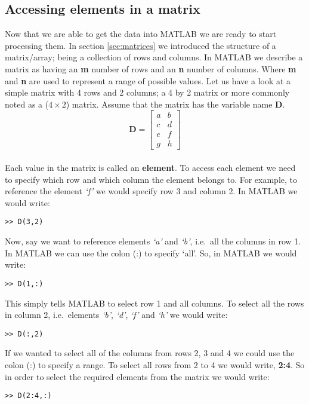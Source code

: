 \documentclass[12pt,a4paper]{article}
\begin{document}
\subsection{Accessing elements in a matrix}
Now that we are able to get the data into MATLAB we are ready to start processing them.  
In section \ref{sec:matrices} we introduced the structure of a matrix/array; being a collection of rows and columns.  
In MATLAB we describe a matrix as having an \textbf{m} number of rows and an \textbf{n} number of columns.  
Where \textbf{m} and \textbf{n} are used to represent a range of possible values.  
Let us have a look at a simple matrix with 4 rows and 2 columns; a 
4 by 2 matrix or more commonly noted as a ($4\times2$) matrix.  
Assume that the matrix has the variable name \textbf{D}.\\
\[ \textbf{D} = \left[ \begin{array}{cc}
a & b\\
c & d\\
e & f\\
g & h \end{array} \right]\]\\

Each value in the matrix is called an \textbf{element}.  
To access each element we need to specify which row and which column the element belongs to.  
For example, to reference the element \emph{`f'} we would specify row 3 and column 2.  
In MATLAB we would write:
\begin{lstlisting}[style=Matlab-editor]
>> D(3,2)
\end{lstlisting}	
Now, say we want to reference elements \emph{`a'} and \emph{`b'}, i.e.~all the columns in row 1.  
In MATLAB we can use the colon (:) to specify `all'.  
So, in MATLAB we would write:
\begin{lstlisting}[style=Matlab-editor]
>> D(1,:)
\end{lstlisting}

This simply tells MATLAB to select row 1 and all columns.  
To select all the rows in column 2, i.e.~elements \emph{`b'}, \emph{`d'}, \emph{`f'} and \emph{`h'} we would write:
\begin{lstlisting}[style=Matlab-editor]
>> D(:,2)
\end{lstlisting}

If we wanted to select all of the columns from rows 2, 3 and 4 we could use the colon (:) to specify a range.  
To select all rows from 2 to 4 we would write, \textbf{2:4}.  
So in order to select the required elements from the matrix we would write:
\begin{lstlisting}[style=Matlab-editor]
>> D(2:4,:)
\end{lstlisting}
	
\end{document}
